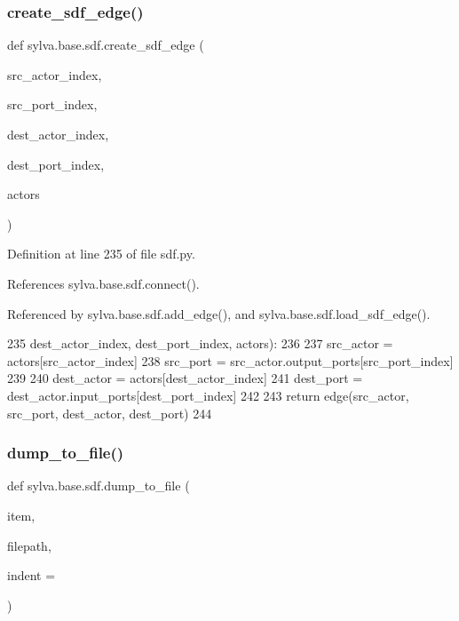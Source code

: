 \subsubsection{\texorpdfstring{create\+\_\+sdf\+\_\+edge()}{create\_sdf\_edge()}}
{\footnotesize\ttfamily def sylva.\+base.\+sdf.\+create\+\_\+sdf\+\_\+edge (\begin{DoxyParamCaption}\item[{}]{src\+\_\+actor\+\_\+index,  }\item[{}]{src\+\_\+port\+\_\+index,  }\item[{}]{dest\+\_\+actor\+\_\+index,  }\item[{}]{dest\+\_\+port\+\_\+index,  }\item[{}]{actors }\end{DoxyParamCaption})}



Definition at line 235 of file sdf.\+py.



References sylva.\+base.\+sdf.\+connect().



Referenced by sylva.\+base.\+sdf.\+add\+\_\+edge(), and sylva.\+base.\+sdf.\+load\+\_\+sdf\+\_\+edge().


\begin{DoxyCode}
235                         dest\_actor\_index, dest\_port\_index, actors):
236 
237         src\_actor = actors[src\_actor\_index]
238         src\_port = src\_actor.output\_ports[src\_port\_index]
239 
240         dest\_actor = actors[dest\_actor\_index]
241         dest\_port = dest\_actor.input\_ports[dest\_port\_index]
242 
243         \textcolor{keywordflow}{return} edge(src\_actor, src\_port, dest\_actor, dest\_port)
244 
\end{DoxyCode}
\mbox{\label{namespacesylva_1_1base_1_1sdf_a55c1c6ea91b0ed9948ce670cd269b88b}} 
\subsubsection{\texorpdfstring{dump\+\_\+to\+\_\+file()}{dump\_to\_file()}}
{\footnotesize\ttfamily def sylva.\+base.\+sdf.\+dump\+\_\+to\+\_\+file (\begin{DoxyParamCaption}\item[{}]{item,  }\item[{}]{filepath,  }\item[{}]{indent = {} }\end{DoxyParamCaption})}



